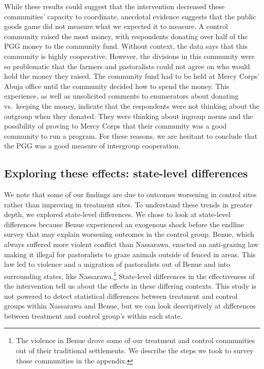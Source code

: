 \documentclass[11pt]{article}
\begin{document}
While these results could suggest that the intervention decreased these
communities' capacity to coordinate, anecdotal evidence suggests that
the public goods game did not measure what we expected it to measure. A
control community raised the most money, with respondents donating over
half of the PGG money to the community fund. Without context, the data
says that this community is highly cooperative. However, the divisions
in this community were so problematic that the farmers and pastoralists
could not agree on who would hold the money they raised. The community
fund had to be held at Mercy Corps' Abuja office until the community
decided how to spend the money. This experience, as well as unsolicited
comments to enumerators about donating vs.~keeping the money, indicate
that the respondents were not thinking about the outgroup when they
donated. They were thinking about ingroup norms and the possibility of
proving to Mercy Corps that their community was a good community to run
a program. For these reasons, we are hesitant to conclude that the PGG
was a good measure of intergroup cooperation.

\hypertarget{exploring-these-effects-state-level-differences}{%
\subsection{Exploring these effects: state-level
differences}\label{exploring-these-effects-state-level-differences}}

We note that some of our findings are due to outcomes worsening in
control sites rather than improving in treatment sites. To understand
these trends in greater depth, we explored state-level differences. We
chose to look at state-level differences because Benue experienced an
exogenous shock before the endline survey that may explain worsening
outcomes in the control group. Benue, which always suffered more violent
conflict than Nassarawa, enacted an anti-grazing law making it illegal
for pastoralists to graze animals outside of fenced in areas. This law
led to violence and a migration of pastoralists out of Benue and into
surrounding states, like Nassarawa.\footnote{The violence in Benue drove
  some of our treatment and control communities out of their traditional
  settlements. We describe the steps we took to survey those communities
  in the appendix.} State-level differences in the effectiveness of the
intervention tell us about the effects in these differing contexts. This
study is not powered to detect statistical differences between treatment
and control groups within Nassarawa and Benue, but we can look
descriptively at differences between treatment and control group's
within each state.
\end{document}
